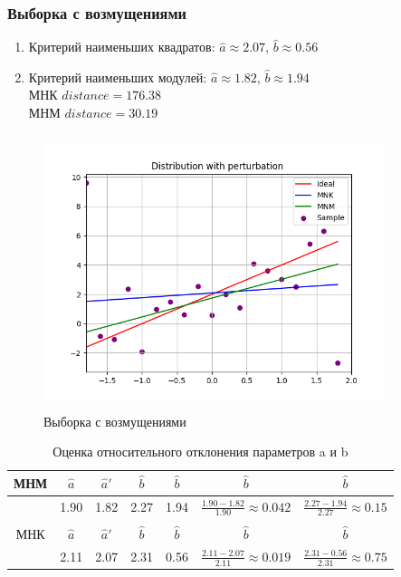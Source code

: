 \documentclass[a4paper,14pt]{article}
\begin{document}
	\subsubsection{Выборка с возмущениями}
	\begin{enumerate}
		\item{Критерий наименьших квадратов:}
		$\hat{a}\approx 2.07$, $\hat{b}\approx 0.56$
		\item{Критерий наименьших модулей:}
		$\hat{a}\approx 1.82$, $\hat{b}\approx 1.94$\\
		МНК $distance = 176.38$\\
		МНМ $distance = 30.19$
	\end{enumerate}
	\begin{figure}[H]
		\centering
		\includegraphics[width = 10cm, height = 8cm]{../image/lab6_2.png}
		\caption{Выборка с возмущениями}
		\label{w_pert}
	\end{figure}
	\begin{table}[H]
		\centering
		\begin{tabular}{| c | c | c | c | c | c | c |}
			\hline
			МНМ   &  $\hat{a}$  & $\hat{a}'$ & $\hat{b}$ & $\hat{b}$ & $\hat{b}$ & $\hat{b}$\\ \hline
			&  1.90 & 1.82 & 2.27 & 1.94 & $\frac{1.90 - 1.82}{1.90} \approx 0.042$ &  $\frac{2.27 - 1.94}{2.27} \approx 0.15$\\ \hline
			&   &   &   &   &   & \\ \hline
			МНК   &  $\hat{a}$  & $\hat{a}'$ & $\hat{b}$ & $\hat{b}$ & $\hat{b}$ & $\hat{b}$\\ \hline
			&  2.11 & 2.07 & 2.31 & 0.56 & $\frac{2.11 - 2.07}{2.11} \approx 0.019$ &  $\frac{2.31 - 0.56}{2.31} \approx 0.75$\\ \hline
		\end{tabular}
		\caption{Оценка относительного отклонения параметров a и b}
		\label{tab:interv_simple}
	\end{table}
\end{document}
